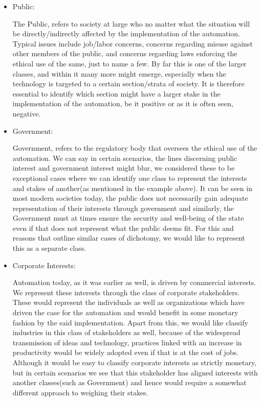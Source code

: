 \begin{itemize}
\item Public:
\begin{pointenv}
The Public, refers to society at large who no matter what the situation will be directly/indirectly affected by the implementation of the automation. Typical issues include job/labor concerns, concerns regarding misuse against other members of the public, and concerns regarding laws enforcing the ethical use of the same, just to name a few. By far this is one of the larger classes, and within it many more might emerge, especially when the technology is targeted to a certain section/strata of society. It is therefore essential to identify which section might have a larger stake in the implementation of the automation, be it positive or as it is often seen, negative.
\end{pointenv}
\item Government:
\begin{pointenv}
Government, refers to the regulatory body that oversees the ethical use of the automation. We can say in certain scenarios, the lines discerning public interest and government interest might blur, we considered these to be exceptional cases where we can identify one class to represent the interests and stakes of another(as mentioned in the example above). It can be seen in most modern societies today, the public does not necessarily gain adequate representation of their interests through government and similarly, the Government must at times ensure the security and well-being of the state even if that does not represent what the public deems fit. For this and reasons that outline similar cases of dichotomy, we would like to represent this as a separate class.
\end{pointenv}
\item Corporate Interests:
\begin{pointenv}
Automation today, as it was earlier as well, is driven by commercial interests. We represent these interests through the class of corporate stakeholders. These would represent the individuals as well as organizations which have driven the case for the automation and would benefit in some monetary fashion by the said implementation. Apart from this, we would like classify industries in this class of stakeholders as well, because of the widespread transmission of ideas and technology, practices linked with an increase in productivity would be widely adopted even if that is at the cost of jobs. Although it would be easy to classify corporate interests as strictly monetary, but in certain scenarios we see that this stakeholder has aligned interests with another classes(such as Government) and hence would require a somewhat different approach to weighing their stakes.
\end{pointenv}
\end{itemize}
